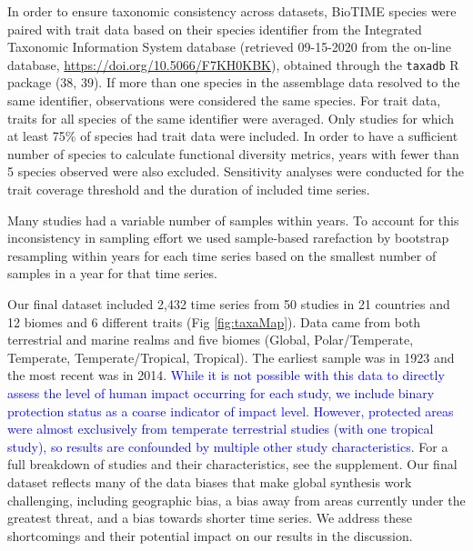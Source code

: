 \documentclass{article}
\begin{document}
In order to ensure taxonomic consistency across datasets, BioTIME
species were paired with trait data based on their species identifier
from the Integrated Taxonomic Information System database (retrieved
09-15-2020 from the on-line database,
\url{https://doi.org/10.5066/F7KH0KBK}), obtained through the
\texttt{taxadb} R package (38, 39). If more than one species in the
assemblage data resolved to the same identifier, observations were
considered the same species. For trait data, traits for all species of
the same identifier were averaged. Only studies for which at least 75\%
of species had trait data were included. In order to have a sufficient
number of species to calculate functional diversity metrics, years with
fewer than 5 species observed were also excluded. Sensitivity analyses
were conducted for the trait coverage threshold and the duration of
included time series.

Many studies had a variable number of samples within years. To account
for this inconsistency in sampling effort we used sample-based
rarefaction by bootstrap resampling within years for each time series
based on the smallest number of samples in a year for that time series.

Our final dataset included 2,432 time series from 50 studies in 21
countries and 12 biomes and 6 different traits (Fig \ref{fig:taxaMap}).
Data came from both terrestrial and marine realms and five biomes
(Global, Polar/Temperate, Temperate, Temperate/Tropical, Tropical). The
earliest sample was in 1923 and the most recent was in 2014.
\textcolor{blue}{While it is not possible with this data to directly assess the level of human impact occurring for each study, we include binary protection status as a coarse indicator of impact level. However, protected areas were almost exclusively from temperate terrestrial studies (with one tropical study), so results are confounded by multiple other study characteristics.}
For a full breakdown of studies and their characteristics, see the
supplement. Our final dataset reflects many of the data biases that make
global synthesis work challenging, including geographic bias, a bias
away from areas currently under the greatest threat, and a bias towards
shorter time series. We address these shortcomings and their potential
impact on our results in the discussion.
\end{document}
